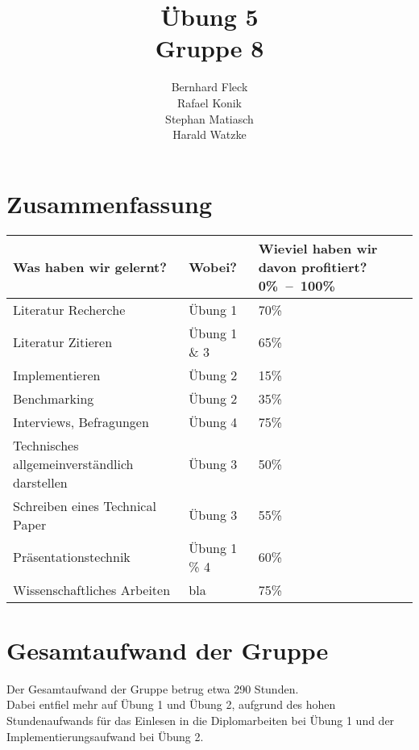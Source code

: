 \documentclass[11pt]{article} %
\title{Übung 5\\Gruppe 8}
\author{Bernhard Fleck\\Rafael Konik\\Stephan Matiasch\\Harald Watzke}
\begin{document}
\maketitle

\section{Zusammenfassung}

\begin{table}[!ht]
   \begin{center}
	\begin{tabular}{p{6cm}lm{3cm}}
    \toprule
	\textbf{Was haben wir gelernt?} & \textbf{Wobei?} & \textbf{Wieviel haben wir davon profitiert? 0\%~--~100\%} \tabularnewline
    \midrule
	 Literatur Recherche & Übung 1 & 70\% \tabularnewline
     \addlinespace
 	 Literatur Zitieren & Übung 1 \& 3 & 65\% \tabularnewline
     \addlinespace
	 Implementieren & Übung 2 & 15\% \tabularnewline
     \addlinespace
	 Benchmarking & Übung 2 & 35\% \tabularnewline
     \addlinespace
	 Interviews, Befragungen & Übung 4 & 75\% \tabularnewline
     \addlinespace
	 Technisches all\-ge\-mein\-ver\-ständ\-lich darstellen & Übung 3 & 50\% \tabularnewline
     \addlinespace
	 Schreiben eines Technical Paper & Übung 3 & 55\% \tabularnewline
     \addlinespace
	 Präsentationstechnik & Übung 1 \% 4 & 60\% \tabularnewline
     \addlinespace
	 Wissenschaftliches Arbeiten & bla & 75\% \tabularnewline

     \bottomrule
	\end{tabular}
   \end{center}
\end{table}

\section{Gesamtaufwand der Gruppe}

Der Gesamtaufwand der Gruppe betrug etwa 290 Stunden.\\ Dabei entfiel mehr auf Übung 1 und Übung 2, aufgrund des hohen Stundenaufwands für das Einlesen in die Diplomarbeiten bei Übung 1 und der Implementierungsaufwand bei Übung 2.
\end{document}
